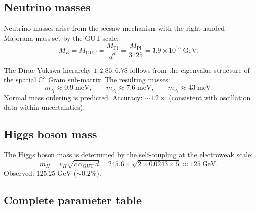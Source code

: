\subsection{Neutrino masses}

Neutrino masses arise from the seesaw mechanism with the right-handed Majorana mass set by the GUT scale:
\begin{equation}
M_R = M_\text{GUT} = \frac{M_\text{Pl}}{d^d} = \frac{M_\text{Pl}}{3125} = 3.9 \times 10^{15}\;\text{GeV}.
\end{equation}

The Dirac Yukawa hierarchy $1 : 2.85 : 6.78$ follows from the eigenvalue structure of the spatial $\mathbb{C}^3$ Gram sub-matrix. The resulting masses:
\begin{equation}
m_{\nu_1} \approx 0.9\;\text{meV}, \qquad m_{\nu_2} \approx 7.6\;\text{meV}, \qquad m_{\nu_3} \approx 43\;\text{meV}.
\end{equation}
Normal mass ordering is predicted. Accuracy: $\sim 1.2\times$ (consistent with oscillation data within uncertainties).

\subsection{Higgs boson mass}

The Higgs boson mass is determined by the self-coupling at the electroweak scale:
\begin{equation}
m_H = v_H\sqrt{c\,\alpha_\text{GUT}\,d} = 245.6 \times \sqrt{2 \times 0.0243 \times 5} \approx 125\;\text{GeV}.
\end{equation}
Observed: $125.25\;\text{GeV}$ ($\sim 0.2\%$).

\subsection{Complete parameter table}

